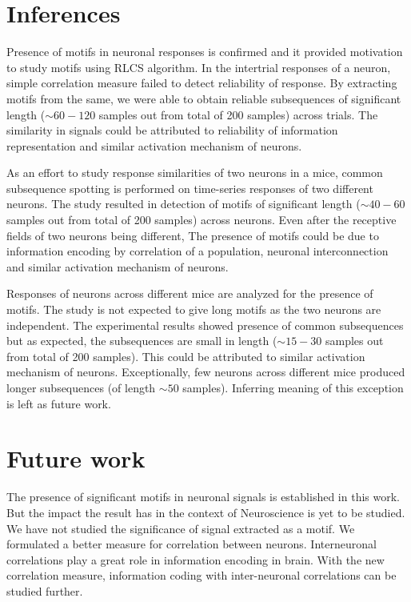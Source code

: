 \documentclass[MTech]{iitmdiss}
\begin{document}
\section{Inferences} %
\label{sec:inferences}
Presence of motifs in neuronal responses is confirmed and it provided motivation to study motifs using RLCS algorithm. In the intertrial responses of a neuron, simple correlation measure failed to detect reliability of response. By extracting motifs from the same, we were able to obtain reliable subsequences of significant length ($\sim 60 - 120$ samples out from total of 200 samples) across trials. The similarity in signals could be attributed to reliability of information representation and similar activation mechanism of neurons. 

As an effort to study response similarities of two neurons in a mice, common subsequence spotting is performed on time-series responses of two different neurons. The study resulted in detection of motifs of significant length ($\sim 40 - 60$ samples out from total of 200 samples) across neurons. Even after the receptive fields of two neurons being different, The presence of motifs could be due to information encoding by correlation of a population, neuronal interconnection and similar activation mechanism of neurons.

Responses of neurons across different mice are analyzed for the presence of motifs. The study is not expected to give long motifs as the two neurons are independent. The experimental results showed presence of common subsequences but as expected, the subsequences are small in length ($\sim 15 - 30$ samples out from total of 200 samples). This could be attributed to similar activation mechanism of neurons. Exceptionally, few neurons across different mice produced longer subsequences (of length $\sim 50$ samples). Inferring meaning of this exception is left as future work.
\section{Future work} %
\label{sec:future_work}
The presence of significant motifs in neuronal signals is established in this work. But the impact the result has in the context of Neuroscience is yet to be studied. We have not studied the significance of signal extracted as a motif. We formulated a better measure for correlation between neurons. Interneuronal correlations play a great role in information encoding in brain. With the new correlation measure, information coding with inter-neuronal correlations can be studied further.
\end{document}
